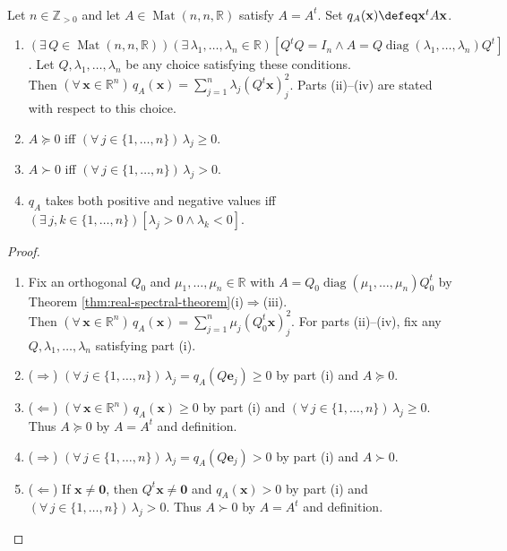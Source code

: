 \begin{theorem} \label{thm:real-quadratic-form-principal-axes} \\
Let $n\in\mathbb{Z}_{>0}$ and let $A\in\operatorname{Mat}(n,n,\mathbb{R})$ satisfy $A=A^t$. Set $q_A(\mathbf{x})\defeq\mathbf{x}^tA\mathbf{x}$.
\begin{enumerate}[label=(\roman*)]
\setlength{\itemsep}{0pt}
\item $(\exists\,Q\in\operatorname{Mat}(n,n,\mathbb{R}))(\exists\,\lambda_1,\ldots,\lambda_n\in\mathbb{R})[Q^tQ=I_n\land A=Q\operatorname{diag}(\lambda_1,\ldots,\lambda_n)Q^t]$. Let $Q,\lambda_1,\ldots,\lambda_n$ be any choice satisfying these conditions.\\
Then $(\forall\,\mathbf{x}\in\mathbb{R}^n)\,q_A(\mathbf{x})=\sum\limits_{j=1}^{n}\lambda_j(Q^t\mathbf{x})_j^2$. Parts (ii)--(iv) are stated with respect to this choice.
\item $A\succeq0$ iff $(\forall\,j\in\{1,\ldots,n\})\,\lambda_j\geq0$.
\item $A\succ0$ iff $(\forall\,j\in\{1,\ldots,n\})\,\lambda_j>0$.
\item $q_A$ takes both positive and negative values iff $(\exists\,j,k\in\{1,\ldots,n\})[\lambda_j>0\land\lambda_k<0]$.
\end{enumerate}
\begin{proof}
\begin{enumerate}[label=(\roman*)]
\setlength{\itemsep}{0pt}
\item[$(i)$] Fix an orthogonal $Q_0$ and $\mu_1,\ldots,\mu_n\in\mathbb{R}$ with $A=Q_0\operatorname{diag}(\mu_1,\ldots,\mu_n)Q_0^t$ by Theorem \ref{thm:real-spectral-theorem}(i)$\Rightarrow$(iii).\\
Then $(\forall\,\mathbf{x}\in\mathbb{R}^n)\,q_A(\mathbf{x})=\sum\limits_{j=1}^{n}\mu_j(Q_0^t\mathbf{x})_j^2$. For parts (ii)--(iv), fix any $Q,\lambda_1,\ldots,\lambda_n$ satisfying part (i).
\item[$(ii)$] ($\Rightarrow$) $(\forall\,j\in\{1,\ldots,n\})\,\lambda_j=q_A(Q\mathbf{e}_j)\geq0$ by part (i) and $A\succeq0$.
\item[$(ii)$] ($\Leftarrow$) $(\forall\,\mathbf{x}\in\mathbb{R}^n)\,q_A(\mathbf{x})\geq0$ by part (i) and $(\forall\,j\in\{1,\ldots,n\})\,\lambda_j\geq0$. Thus $A\succeq0$ by $A=A^t$ and definition.
\item[$(iii)$] ($\Rightarrow$) $(\forall\,j\in\{1,\ldots,n\})\,\lambda_j=q_A(Q\mathbf{e}_j)>0$ by part (i) and $A\succ0$.
\item[$(iii)$] ($\Leftarrow$) If $\mathbf{x}\neq\mathbf{0}$, then $Q^t\mathbf{x}\neq\mathbf{0}$ and $q_A(\mathbf{x})>0$ by part (i) and $(\forall\,j\in\{1,\ldots,n\})\,\lambda_j>0$. Thus $A\succ0$ by $A=A^t$ and definition.

\end{enumerate}
\end{proof}
\end{theorem}
